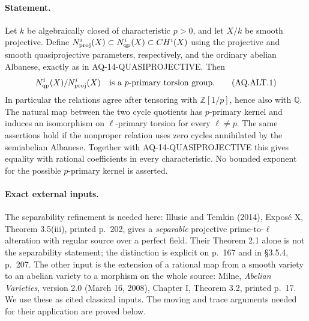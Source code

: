 \documentclass[11pt,a4paper]{article}
\theoremstyle{definition}\newtheorem{definition}[theorem]{Definition}
\theoremstyle{remark}\newtheorem{remark}[theorem]{Remark}
\begin{document}
\paragraph{Statement.}
Let $k$ be algebraically closed of characteristic $p>0$,
and let $X/k$ be smooth projective.  Define
$N^i_{\rm proj}(X)\subset N^i_{\rm qp}(X)\subset CH^i(X)$
using the projective and smooth quasiprojective parameters,
respectively, and the ordinary abelian Albanese, exactly as
in AQ-14-QUASIPROJECTIVE.  Then
\[
 N^i_{\rm qp}(X)/N^i_{\rm proj}(X)
 \quad\hbox{is a $p$-primary torsion group.}               \tag{AQ.ALT.1}
\]
In particular the relations agree after tensoring with
$\mathbb Z[1/p]$, hence also with $\mathbb Q$.
The natural map between the two cycle quotients has
$p$-primary kernel and induces an isomorphism on
$\ell$-primary torsion for every $\ell\ne p$.
The same assertions hold if the nonproper relation uses
zero cycles annihilated by the semiabelian Albanese.
Together with AQ-14-QUASIPROJECTIVE this gives equality
with rational coefficients in every characteristic.
No bounded exponent for the possible $p$-primary kernel
is asserted.

\paragraph{Exact external inputs.}
The separability refinement is needed here: Illusie and
Temkin (2014), Expos\'e X, Theorem 3.5(iii), printed p.~202,
gives a \emph{separable} projective prime-to-$\ell$ alteration
with regular source over a perfect field.  Their
Theorem 2.1 alone is not the separability statement;
the distinction is explicit on p.~167 and in \S3.5.4,
p.~207.  The other input is the extension of a rational
map from a smooth variety to an abelian variety to a
morphism on the whole source: Milne, \emph{Abelian
Varieties}, version 2.0 (March 16, 2008), Chapter I,
Theorem 3.2, printed p.~17.  We use these as cited
classical inputs.  The moving and trace arguments
needed for their application are proved below.
\end{document}

